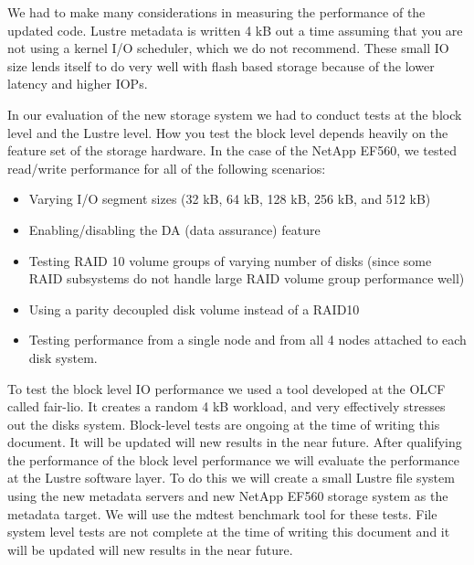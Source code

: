 \documentclass[conference,compsoc]{IEEEtran}
\begin{document}
We had to make many considerations in measuring the performance of the updated
code. Lustre metadata is written 4 kB out a time assuming that you are not
using a kernel I/O scheduler, which we do not recommend. These small IO size
lends itself to do very well with flash based storage because of the lower
latency and higher IOPs.

In our evaluation of the new storage system we had to conduct tests at the
block level and the Lustre level. How you test the block level depends heavily
on the feature set of the storage hardware. In the case of the NetApp EF560, we
tested read/write performance for all of the following scenarios:

\begin{itemize}

\item Varying I/O segment sizes (32 kB, 64 kB, 128 kB, 256 kB, and 512 kB)

\item Enabling/disabling the DA (data assurance) feature

\item Testing RAID 10 volume groups of varying number of disks (since some RAID subsystems do not handle large RAID volume group performance well)

\item Using a parity decoupled disk volume instead of a RAID10

\item Testing performance from a single node and from all 4 nodes attached to each disk system.

\end{itemize}

To test the block level IO performance we used a tool developed at the OLCF
called fair-lio. It creates a random 4 kB workload, and very effectively
stresses out the disks system. Block-level tests are ongoing at the time of
writing this document. It will be updated will new results in the near future.
After qualifying the performance of the block level performance we will
evaluate the performance at the Lustre software layer. To do this we will
create a small Lustre file system using the new metadata servers and new NetApp
EF560 storage system as the metadata target. We will use the mdtest benchmark
tool for these tests. File system level tests are not complete at the time of
writing this document and it will be updated will new results in the near
future.

\end{document}
